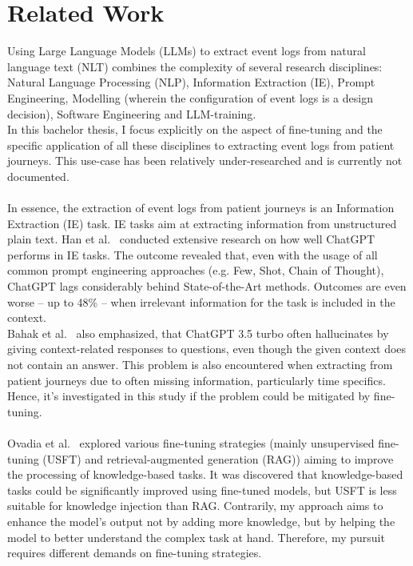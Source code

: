 \section{Related Work}
\label{related_work}
Using Large Language Models (LLMs) to extract event logs from natural language text (NLT) combines the complexity of several research disciplines: Natural Language Processing (NLP), Information Extraction (IE), Prompt Engineering, Modelling (wherein the configuration of event logs is a design decision), Software Engineering and LLM-training.\\
In this bachelor thesis, I focus explicitly on the aspect of fine-tuning and the specific application of all these disciplines to extracting event logs from patient journeys. This use-case has been relatively under-researched and is currently not documented.\\\\
In essence, the extraction of event logs from patient journeys is an Information Extraction (IE) task. IE tasks aim at extracting information from unstructured plain text. Han et al.~\cite{han_is_2023} conducted extensive research on how well ChatGPT performs in IE tasks. The outcome revealed that, even with the usage of all common prompt engineering approaches (e.g. Few, Shot, Chain of Thought), ChatGPT lags considerably behind State-of-the-Art methods. Outcomes are even worse – up to 48\% – when irrelevant information for the task is included in the context.\\
Bahak et al.~\cite{bahak_evaluating_2023} also emphasized, that ChatGPT 3.5 turbo often hallucinates by giving context-related responses to questions, even though the given context does not contain an answer. This problem is also encountered when extracting from patient journeys due to often missing information, particularly time specifics. Hence, it's investigated in this study if the problem could be mitigated by fine-tuning.\\\\
Ovadia et al.~\cite{ovadia_fine-tuning_2024} explored various fine-tuning strategies (mainly unsupervised fine-tuning (USFT) and retrieval-augmented generation (RAG)) aiming to improve the processing of knowledge-based tasks. It was discovered that knowledge-based tasks could be significantly improved using fine-tuned models, but USFT is less suitable for knowledge injection than RAG. Contrarily, my approach aims to enhance the model's output not by adding more knowledge, but by helping the model to better understand the complex task at hand. Therefore, my pursuit requires different demands on fine-tuning strategies.\\\\
